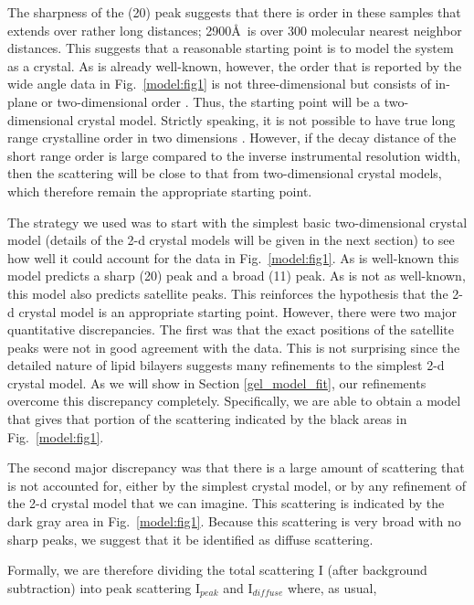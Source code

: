 The sharpness of the (20) peak suggests that there is order in these samples
that extends over rather long distances; 2900\AA\ is over 300 molecular nearest
neighbor distances.  This suggests that a reasonable
starting point is to model the system as a crystal.  As is already well-known,
however, the order that is reported by the wide angle data in Fig.\ \ref{model:fig1}
is not three-dimensional but consists of in-plane or two-dimensional
order \cite{LevTh,Tar73,Hui76,HenHos83,Smi88,STN92}.
Thus, the starting point will be a two-dimensional crystal model.
Strictly speaking, it is not possible to have true long range crystalline order
in two dimensions \cite{Mermin}.  However, if the decay distance of the short
range order is large compared to the inverse instrumental resolution width, 
then the scattering will be close \cite{Dutta} to that from 
two-dimensional crystal models, which therefore remain the
appropriate starting point.

The strategy we used was to start with the simplest
basic two-dimensional crystal model (details of the 2-d crystal models
will be given in the next section) to 
see how well it could account for the data in Fig.\ \ref{model:fig1}.
As is well-known \cite{LevTh,Tar73,Hui76,McI80} this model predicts a sharp (20) peak and a broad
(11) peak.  As is not as well-known, this model also predicts satellite
peaks.  This reinforces the hypothesis that the 2-d crystal model
is an appropriate starting point.  However, there were two major
quantitative discrepancies.  The first was that the exact positions of
the satellite peaks were not in good agreement with the data.  This is not surprising
since the detailed nature of lipid bilayers suggests many refinements
to the simplest 2-d crystal model.  As we will show in Section 
\ref{gel_model_fit}, our
refinements overcome this discrepancy completely.  Specifically, we are able
to obtain a model that gives that portion of the scattering indicated by
the black areas in Fig.\ \ref{model:fig1}.

The second major discrepancy was that there is a large amount of scattering 
that is not accounted for, either by the simplest crystal model, or by 
any refinement of the 2-d crystal model that we can imagine.  This scattering 
is indicated by the dark gray area in Fig.\ \ref{model:fig1}.  Because this 
scattering is 
very broad with no sharp peaks, we suggest that it be identified as
diffuse scattering.  

Formally, we are therefore dividing the total scattering I
(after background subtraction) into peak scattering I$_{peak}$ and
I$_{diffuse}$ where, as usual,

